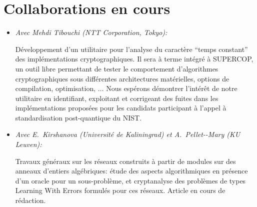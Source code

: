 \documentclass[11pt]{article}
\newcommand{\falcon}{\textsc{Falcon}}
\begin{document}
\section{Collaborations en cours}

\begin{itemize}[label=$\bullet$]

  
  
\item {\em Avec Mehdi Tibouchi (NTT Corporation, Tokyo):}

  Développement d'un utilitaire pour l'analyse du caractère ``temps constant'' des implémentations cryptographiques. Il sera à terme intégré à SUPERCOP, un outil libre permettant de tester le comportement d'algorithmes cryptographiques sous différentes architectures matérielles, options de compilation, optimisation, $\dotsc$  Nous espérons démontrer l'intérêt de notre utilitaire en identifiant, exploitant et corrigeant des fuites dans les implémentations proposées pour les candidats participant à l'appel à standardisation post-quantique du NIST. 
  

  



\item {\em Avec E.~Kirshanova (Université de Kaliningrad) et A.~Pellet-\hspace{0pt}-Mary (KU Leuven):}

  Travaux généraux sur les réseaux construits à partir de modules sur des anneaux d'entiers algébriques: étude des aspects algorithmiques en présence d'un oracle pour un sous-problème, et cryptanalyse des problèmes de types Learning With Errors formulés pour ces réseaux. Article en cours de rédaction.


\end{itemize}
\end{document}
